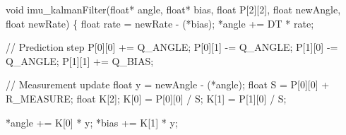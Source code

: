 \documentclass[
  9pt,
  letterpaper,
  abstract,
  titlepage]{scrbook}
\newenvironment{Shaded}{\begin{snugshade}}{\end{snugshade}}
\newcommand{\CommentTok}[1]{\textcolor[rgb]{0.37,0.37,0.37}{#1}}
\newcommand{\DataTypeTok}[1]{\textcolor[rgb]{0.68,0.00,0.00}{#1}}
\newcommand{\DecValTok}[1]{\textcolor[rgb]{0.68,0.00,0.00}{#1}}
\newcommand{\NormalTok}[1]{\textcolor[rgb]{0.00,0.23,0.31}{#1}}
\newcommand{\OperatorTok}[1]{\textcolor[rgb]{0.37,0.37,0.37}{#1}}
\begin{document}
\begin{Shaded}
\begin{Highlighting}[]
\DataTypeTok{void}\NormalTok{ imu\_kalmanFilter}\OperatorTok{(}\DataTypeTok{float}\OperatorTok{*}\NormalTok{ angle}\OperatorTok{,} \DataTypeTok{float}\OperatorTok{*}\NormalTok{ bias}\OperatorTok{,} \DataTypeTok{float}\NormalTok{ P}\OperatorTok{[}\DecValTok{2}\OperatorTok{][}\DecValTok{2}\OperatorTok{],} \DataTypeTok{float}\NormalTok{ newAngle}\OperatorTok{,} \DataTypeTok{float}\NormalTok{ newRate}\OperatorTok{)} \OperatorTok{\{}
  \DataTypeTok{float}\NormalTok{ rate }\OperatorTok{=}\NormalTok{ newRate }\OperatorTok{{-}} \OperatorTok{(*}\NormalTok{bias}\OperatorTok{);}
  \OperatorTok{*}\NormalTok{angle }\OperatorTok{+=}\NormalTok{ DT }\OperatorTok{*}\NormalTok{ rate}\OperatorTok{;}

  \CommentTok{// Prediction step}
\NormalTok{  P}\OperatorTok{[}\DecValTok{0}\OperatorTok{][}\DecValTok{0}\OperatorTok{]} \OperatorTok{+=}\NormalTok{ Q\_ANGLE}\OperatorTok{;}
\NormalTok{  P}\OperatorTok{[}\DecValTok{0}\OperatorTok{][}\DecValTok{1}\OperatorTok{]} \OperatorTok{{-}=}\NormalTok{ Q\_ANGLE}\OperatorTok{;}
\NormalTok{  P}\OperatorTok{[}\DecValTok{1}\OperatorTok{][}\DecValTok{0}\OperatorTok{]} \OperatorTok{{-}=}\NormalTok{ Q\_ANGLE}\OperatorTok{;}
\NormalTok{  P}\OperatorTok{[}\DecValTok{1}\OperatorTok{][}\DecValTok{1}\OperatorTok{]} \OperatorTok{+=}\NormalTok{ Q\_BIAS}\OperatorTok{;}

  \CommentTok{// Measurement update}
  \DataTypeTok{float}\NormalTok{ y }\OperatorTok{=}\NormalTok{ newAngle }\OperatorTok{{-}} \OperatorTok{(*}\NormalTok{angle}\OperatorTok{);}
  \DataTypeTok{float}\NormalTok{ S }\OperatorTok{=}\NormalTok{ P}\OperatorTok{[}\DecValTok{0}\OperatorTok{][}\DecValTok{0}\OperatorTok{]} \OperatorTok{+}\NormalTok{ R\_MEASURE}\OperatorTok{;}
  \DataTypeTok{float}\NormalTok{ K}\OperatorTok{[}\DecValTok{2}\OperatorTok{];}
\NormalTok{  K}\OperatorTok{[}\DecValTok{0}\OperatorTok{]} \OperatorTok{=}\NormalTok{ P}\OperatorTok{[}\DecValTok{0}\OperatorTok{][}\DecValTok{0}\OperatorTok{]} \OperatorTok{/}\NormalTok{ S}\OperatorTok{;}
\NormalTok{  K}\OperatorTok{[}\DecValTok{1}\OperatorTok{]} \OperatorTok{=}\NormalTok{ P}\OperatorTok{[}\DecValTok{1}\OperatorTok{][}\DecValTok{0}\OperatorTok{]} \OperatorTok{/}\NormalTok{ S}\OperatorTok{;}

  \OperatorTok{*}\NormalTok{angle }\OperatorTok{+=}\NormalTok{ K}\OperatorTok{[}\DecValTok{0}\OperatorTok{]} \OperatorTok{*}\NormalTok{ y}\OperatorTok{;}
  \OperatorTok{*}\NormalTok{bias }\OperatorTok{+=}\NormalTok{ K}\OperatorTok{[}\DecValTok{1}\OperatorTok{]} \OperatorTok{*}\NormalTok{ y}\OperatorTok{;}


\end{Highlighting}
\end{Shaded}
\end{document}

